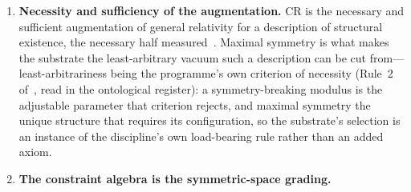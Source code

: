 \documentclass[11pt,a4paper]{article}
\theoremstyle{definition}
\begin{document}
\begin{enumerate}
\item \textbf{Necessity and sufficiency of the augmentation.} CR is the
necessary and sufficient augmentation of general relativity for a
description of structural existence, the necessary half
measured~\cite{JanzenModernParallax,JanzenCRframework}. Maximal symmetry is what
makes the substrate the least-arbitrary vacuum such a description can be cut
from---least-arbitrariness being the programme's own criterion of necessity
(Rule~2 of~\cite{JanzenShadowExistence}, read in the ontological register): a
symmetry-breaking modulus is the adjustable parameter that criterion rejects,
and maximal symmetry the unique structure that requires its configuration, so
the substrate's selection is an instance of the discipline's own load-bearing
rule rather than an added axiom.
\item \textbf{The constraint algebra is the symmetric-space grading.}



\end{enumerate}
\end{document}
